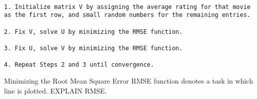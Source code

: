 \documentclass[main.tex]{thesis.tex}
\begin{document}
\begin{lstlisting}[caption=Alternating Least Squares algorithm \cite{aberger14}]

1. Initialize matrix V by assigning the average rating for that movie as the first row, and small random numbers for the remaining entries.

2. Fix V, solve U by minimizing the RMSE function.

3. Fix U, solve V by minimizing the RMSE function.

4. Repeat Steps 2 and 3 until convergence.

\end{lstlisting}

Minimizing the Root Mean Square Error RMSE function denotes a task in which line is plotted. EXPLAIN RMSE.
\end{document}
